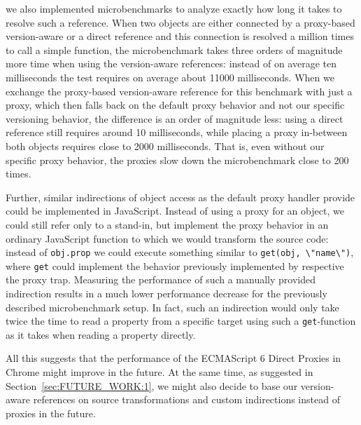  we also implemented microbenchmarks to analyze exactly how long it takes to resolve such a reference.
When two objects are either connected by a proxy-based version-aware or a direct reference and this connection is resolved a million times to call a simple function, the microbenchmark takes three orders of magnitude more time when using the version-aware references: instead of on average ten milliseconds the test requires on average about 11000 milliseconds.
When we exchange the proxy-based version-aware reference for this benchmark with just a proxy, which then falls back on the default proxy behavior and not our specific versioning behavior, the difference is an order of magnitude less: using a direct reference still requires around 10 milliseconds, while placing a proxy in-between both objects requires close to 2000 milliseconds.
That is, even without our specific proxy behavior, the proxies slow down the microbenchmark close to 200 times.


Further, similar indirections of object access as the default proxy handler provide could be implemented in JavaScript.
Instead of using a proxy for an object, we could still refer only to a stand-in, but implement the proxy behavior in an ordinary JavaScript function to which we would transform the source code: instead of \lstinline{obj.prop} we could execute something similar to \lstinline{get(obj, \"name\")}, where \lstinline{get} could implement the behavior previously implemented by respective the proxy trap.
Measuring the performance of such a manually provided indirection results in a much lower performance decrease for the previously described microbenchmark setup.
In fact, such an indirection would only take twice the time to read a property from a specific target using such a \lstinline{get}-function as it takes when reading a property directly. 


All this suggests that the performance of the ECMAScript 6 Direct Proxies in Chrome might improve in the future.
At the same time, as suggested in Section~\ref{sec:FUTURE_WORK:1}, we might also decide to base our version-aware references on source transformations and custom indirections instead of proxies in the future.
